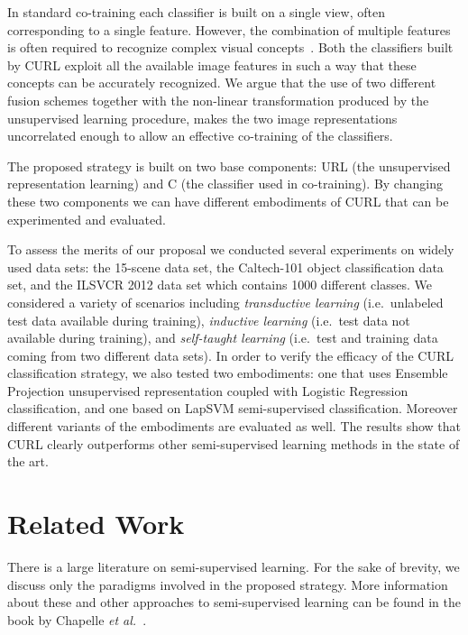 \documentclass[journal,11pt]{IEEEtran}
\newcommand{\ADD}[1]{#1}
\newcommand{\coso}{strategy}
\newcommand{\emb}{embodiment}
\begin{document}
In standard co-training each classifier is built on a single view,
often corresponding to a single feature.  However, the combination of
multiple features is often required to recognize complex visual
concepts~\cite{Iyengar03,Gehler09,natarajan12}. Both the classifiers built by CURL exploit all
the available image features in such a way that these concepts can be
accurately recognized.  \ADD{We argue that} the use of two different fusion schemes
together with the non-linear transformation produced by the
unsupervised learning procedure, makes the two image representations
uncorrelated enough to allow an effective co-training of the
classifiers.

\ADD{The proposed \coso{ }is built on two base components: URL (the unsupervised representation learning) and C (the classifier used in co-training).
By changing these two components we can have different \emb{s} of CURL that can be experimented and evaluated.}%

To assess the merits of our proposal we conducted several experiments
on widely used data sets: the 15-scene data set\ADD{, the
Caltech-101 object classification data set, and the ILSVCR 2012 data set which contains 1000 different classes}.  We considered a variety
of scenarios including \emph{transductive learning} (i.e.~unlabeled test data
available during training), \emph{inductive learning} (i.e.~test data not
available during training), and \emph{self-taught learning} (i.e.~test and
training data coming from two different data sets).  \ADD{In order to verify the efficacy of the CURL classification \coso, we also tested two \emb{s}: one that uses Ensemble Projection unsupervised representation coupled with Logistic Regression classification, and one based on LapSVM semi-supervised classification.
Moreover different variants of the \emb{s} are evaluated as well.} The results
show that CURL clearly outperforms other semi-supervised learning
methods in the state of the art.


\section{Related Work}
\label{sec:related}

There is a large literature on semi-supervised learning. For the sake
of brevity, we discuss only the paradigms involved in the proposed
\coso.  More information about these and other approaches to
semi-supervised learning can be found in the book by Chapelle \emph{et
  al.}~\cite{chapelle2006semi}.
\end{document}
